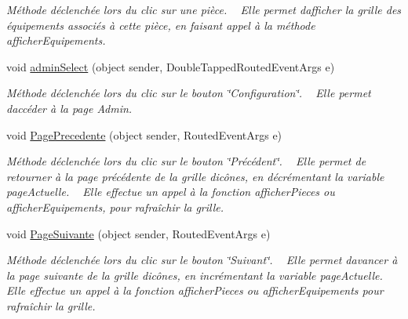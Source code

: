 \begin{DoxyCompactItemize}
\begin{DoxyCompactList}\small\item\em Méthode déclenchée lors du clic sur une pièce. ~\newline
Elle permet d\textquotesingle{}afficher la grille des équipements associés à cette pièce, en faisant appel à la méthode afficher\+Equipements. \end{DoxyCompactList}\item 
void \hyperlink{class_my_domotik_1_1_main_page_adce6e481d0b67c7fae1f60683e1acf7a}{admin\+Select} (object sender, Double\+Tapped\+Routed\+Event\+Args e)
\begin{DoxyCompactList}\small\item\em Méthode déclenchée lors du clic sur le bouton \char`\"{}\+Configuration\char`\"{}. ~\newline
Elle permet d\textquotesingle{}accéder à la page Admin. \end{DoxyCompactList}\item 
void \hyperlink{class_my_domotik_1_1_main_page_ac05fbb555934f2d7df8378e19ce764e1}{Page\+Precedente} (object sender, Routed\+Event\+Args e)
\begin{DoxyCompactList}\small\item\em Méthode déclenchée lors du clic sur le bouton \char`\"{}\+Précédent\char`\"{}. ~\newline
Elle permet de retourner à la page précédente de la grille d\textquotesingle{}icônes, en décrémentant la variable page\+Actuelle. ~\newline
Elle effectue un appel à la fonction afficher\+Pieces ou afficher\+Equipements, pour rafraîchir la grille. \end{DoxyCompactList}\item 
void \hyperlink{class_my_domotik_1_1_main_page_aea16b19b6f9b7b0a1baed07c9887fb14}{Page\+Suivante} (object sender, Routed\+Event\+Args e)
\begin{DoxyCompactList}\small\item\em Méthode déclenchée lors du clic sur le bouton \char`\"{}\+Suivant\char`\"{}. ~\newline
Elle permet d\textquotesingle{}avancer à la page suivante de la grille d\textquotesingle{}icônes, en incrémentant la variable page\+Actuelle. ~\newline
Elle effectue un appel à la fonction afficher\+Pieces ou afficher\+Equipements pour rafraîchir la grille. \end{DoxyCompactList}\item 

\end{DoxyCompactItemize}
